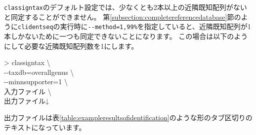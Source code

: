 \documentclass[titlepage,10pt,a4paper]{jsbook}
\newenvironment{cmd}{\begin{oframed}\raggedright\ttfamily\footnotesize\setlength{\baselineskip}{1.4em}}{\end{oframed}\vspace{-1em}}
\begin{document}
\texttt{classigntax}のデフォルト設定では、少なくとも2本以上の近隣既知配列がないと同定することができません。
第\ref{subsection:completereferencedatabase}節のように\texttt{clidentseq}の実行時に\texttt{{-}{-}method=1,99\%}を指定していると、近隣既知配列が1本しかないために一つも同定できないことになります。
この場合は以下のようにして必要な近隣既知配列数を1にします。
\begin{cmd}
{\textgreater} classigntax {\textbackslash}\\
{-}{-}taxdb=overall{\textunderscore}genus {\textbackslash}\\
{-}{-}minnsupporter=1 {\textbackslash}\\
入力ファイル {\textbackslash}\\
出力ファイル↓
\end{cmd}
出力ファイルは表\ref{table:exampleresultsofidentification}のような形のタブ区切りのテキストになっています。
\end{document}
